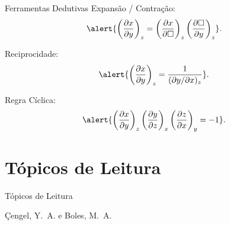     \begin{frame}{Ferramentas Dedutivas}\vspace*{-2em}
        Expansão / Contração:
        \begin{equation*}
            \alert{\left(
                \frac{\partial x}{\partial y}
            \right)_z =
            \left(
                \frac{\partial x}{\partial\square}
            \right)_z
            \left(
                \frac{\partial\square}{\partial y}
            \right)_z}.
        \end{equation*}

        \vspace*\medskipamount
        
        Reciprocidade:
        \begin{equation}
            \alert{\left(
                \frac{\partial x}{\partial y}
            \right)_z =
            \frac{1}{(\partial y/\partial x)_z}}.
        \end{equation}

        \vspace*\medskipamount

        Regra Cíclica:
        \begin{equation}
            \alert{\left(
                \frac{\partial x}{\partial y}
            \right)_z
            \left(
                \frac{\partial y}{\partial z}
            \right)_x
            \left(
                \frac{\partial z}{\partial x}
            \right)_y = -1}.
        \end{equation}
    \end{frame}

\section{Tópicos de Leitura}

    \begin{frame}[allowframebreaks]{Tópicos de Leitura}
        \begin{thebibliography}{Çengel, Y.~A., 2013}
                Çengel, Y.~A. e Boles, M.~A.
        \end{thebibliography}
    \end{frame}

